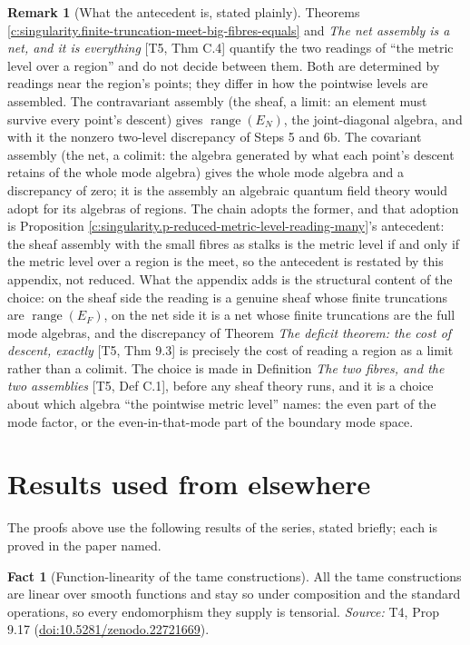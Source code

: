\documentclass[11pt]{article}
\theoremstyle{definition}
\newtheorem{fact}[theorem]{Fact}
\newtheorem{remark}[theorem]{Remark}
\theoremstyle{plain}
\providecommand{\EN}{}\renewcommand{\EN}{E_{N}}
\begin{document}
\begin{remark}[What the antecedent is, stated plainly]\label{c:note.singularity.what-antecedent-stated-plainly}
Theorems \ref{c:singularity.finite-truncation-meet-big-fibres-equals} and \emph{The net assembly is a net, and it is everything} [T5, Thm C.4] quantify the two readings of ``the metric level over a region'' and do not decide between them. Both are determined by readings near the region's points; they differ in how the pointwise levels are assembled. The contravariant assembly (the sheaf, a limit: an element must survive every point's descent) gives $\operatorname{range}(\EN)$, the joint-diagonal algebra, and with it the nonzero two-level discrepancy of Steps 5 and 6b. The covariant assembly (the net, a colimit: the algebra generated by what each point's descent retains of the whole mode algebra) gives the whole mode algebra and a discrepancy of zero; it is the assembly an algebraic quantum field theory would adopt for its algebras of regions. The chain adopts the former, and that adoption is Proposition \ref{c:singularity.p-reduced-metric-level-reading-many}'s antecedent: the sheaf assembly with the small fibres as stalks is the metric level if and only if the metric level over a region is the meet, so the antecedent is restated by this appendix, not reduced. What the appendix adds is the structural content of the choice: on the sheaf side the reading is a genuine sheaf whose finite truncations are $\operatorname{range}(E_F)$, on the net side it is a net whose finite truncations are the full mode algebras, and the discrepancy of Theorem \emph{The deficit theorem: the cost of descent, exactly} [T5, Thm 9.3] is precisely the cost of reading a region as a limit rather than a colimit. The choice is made in Definition \emph{The two fibres, and the two assemblies} [T5, Def C.1], before any sheaf theory runs, and it is a choice about which algebra ``the pointwise metric level'' names: the even part of the mode factor, or the even-in-that-mode part of the boundary mode space.
\end{remark}

\section{Results used from elsewhere}
The proofs above use the following results of the series, stated briefly; each is proved in the paper named.

\begin{fact}[Function-linearity of the tame constructions]\label{c:sheaf.function-linearity-tame-constructions}
All the tame constructions are linear over smooth functions and stay so under composition and the standard operations, so every endomorphism they supply is tensorial.
\emph{Source:} T4, Prop 9.17 (\href{https://doi.org/10.5281/zenodo.22721669}{doi:10.5281/zenodo.22721669}).
\end{fact}
\end{document}
